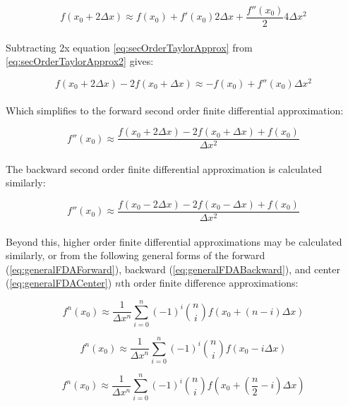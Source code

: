 {  \begin{equation}\label{eq:secOrderTaylorApprox2}
  f(x_{0} + 2\Delta  x) \approx f(x_{0}) + f'(x_{0})2\Delta  x + \frac{f''(x_{0})}{2}4\Delta  x^{2}
  \end{equation}
    \\
  Subtracting 2x equation \ref{eq:secOrderTaylorApprox} from \ref{eq:secOrderTaylorApprox2} gives:
  
    \begin{equation}
  f(x_{0} + 2\Delta  x) - 2f(x_{0} + \Delta  x) \approx -f(x_{0}) + f''(x_{0})\Delta  x^{2}
  \end{equation}
  \\
Which simplifies to the forward second order finite differential approximation:
  
      \begin{equation}\label{eq:fdasecforward}
f''(x_{0}) \approx \frac{f(x_{0} + 2\Delta  x) - 2f(x_{0} + \Delta  x) + f(x_{0})}{\Delta  x^{2}}
  \end{equation}
  \\
  The backward second order finite differential approximation is calculated similarly:
  
        \begin{equation}\label{eq:fdasecbackward}
f''(x_{0}) \approx \frac{f(x_{0} - 2\Delta  x) - 2f(x_{0} - \Delta  x) + f(x_{0})}{\Delta  x^{2}}
  \end{equation}
  \\
 Beyond this, higher order finite differential approximations may be calculated similarly, or from the following general forms of the forward (\ref{eq:generalFDAForward}), backward (\ref{eq:generalFDABackward}), and center (\ref{eq:generalFDACenter}) $n$th order finite difference approximations:
 
  \begin{equation}\label{eq:generalFDAForward}
 f^{n}(x_{0}) \approx \frac{1}{\Delta  x^{n}}\sum_{i=0}^{n}(-1)^{i}\binom {n} {i}f(x_{0} + (n-i)\Delta  x)
 \end{equation}
 
 \begin{equation}\label{eq:generalFDABackward}
 f^{n}(x_{0}) \approx \frac{1}{\Delta  x^{n}}\sum_{i=0}^{n}(-1)^{i}\binom {n} {i}f(x_{0} - i\Delta  x)
 \end{equation}
 
  \begin{equation}\label{eq:generalFDACenter}
 f^{n}(x_{0}) \approx \frac{1}{\Delta  x^{n}}\sum_{i=0}^{n}(-1)^{i}\binom {n} {i}f(x_{0} + \left(\frac{n}{2}-i\right)\Delta  x)
 \end{equation}
 
}

